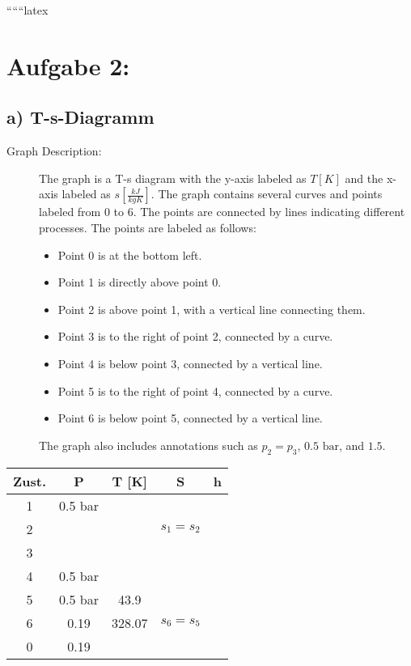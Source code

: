 
``````latex


\section*{Aufgabe 2:}

\subsection*{a) T-s-Diagramm}

\begin{description}
    \item[Graph Description:] The graph is a T-s diagram with the y-axis labeled as $T [K]$ and the x-axis labeled as $s \left[ \frac{kJ}{kgK} \right]$. The graph contains several curves and points labeled from 0 to 6. The points are connected by lines indicating different processes. The points are labeled as follows:
    \begin{itemize}
        \item Point 0 is at the bottom left.
        \item Point 1 is directly above point 0.
        \item Point 2 is above point 1, with a vertical line connecting them.
        \item Point 3 is to the right of point 2, connected by a curve.
        \item Point 4 is below point 3, connected by a vertical line.
        \item Point 5 is to the right of point 4, connected by a curve.
        \item Point 6 is below point 5, connected by a vertical line.
    \end{itemize}
    The graph also includes annotations such as $p_2 = p_3$, $0.5 \text{ bar}$, and $1.5$.
\end{description}

\begin{table}[h!]
    \centering
    \begin{tabular}{|c|c|c|c|c|}
        \hline
        Zust. & P & T [K] & S & h \\
        \hline
        1 & 0.5 bar & & & \\
        \hline
        2 & & & $s_1 = s_2$ & \\
        \hline
        3 & & & & \\
        \hline
        4 & 0.5 bar & & & \\
        \hline
        5 & 0.5 bar & 43.9 & & \\
        \hline
        6 & 0.19 & 328.07 & $s_6 = s_5$ & \\
        \hline
        0 & 0.19 & & & \\
        \hline
    \end{tabular}
\end{table}

